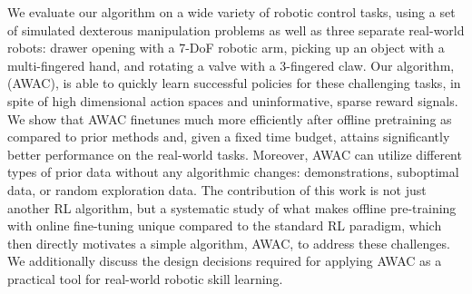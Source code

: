 \documentclass[conference]{IEEEtran}
\begin{document}
We evaluate our algorithm on a wide variety of robotic control tasks, using a set of simulated dexterous manipulation problems as well as three separate real-world robots: drawer opening with a 7-DoF robotic arm, picking up an object with a multi-fingered hand, and rotating a valve with a 3-fingered claw. Our algorithm, \METHOD (AWAC), is able to quickly learn successful policies for these challenging tasks, in spite of high dimensional action spaces and uninformative, sparse reward signals. We show that AWAC finetunes much more efficiently after offline pretraining as compared to prior methods and, given a fixed time budget, attains significantly better performance on the real-world tasks. Moreover, AWAC can utilize different types of prior data without any algorithmic changes: demonstrations, suboptimal data, or random exploration data. The contribution of this work is not just another RL algorithm, but a systematic study of what makes offline pre-training with online fine-tuning unique compared to the standard RL paradigm, which then directly motivates a simple algorithm, AWAC, to address these challenges. We additionally discuss the design decisions required for applying AWAC as a practical tool for real-world robotic skill learning.  
\end{document}
